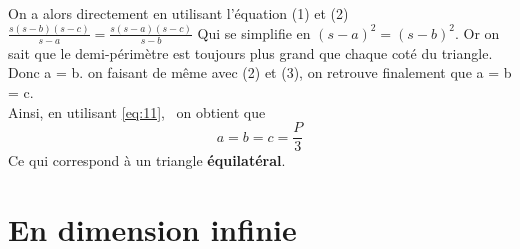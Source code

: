 \documentclass[12pt]{report}
\begin{document}
On a alors directement en utilisant l'équation (1) et (2) $\frac{s(s-b)(s-c)}{s-a} = \frac{s(s-a)(s-c)}{s-b}$
Qui se simplifie en $(s-a)^{2}=(s-b)^{2}$.
Or on sait que le demi-périmètre est toujours plus grand que chaque coté du triangle. Donc a = b.
on faisant de même avec (2) et (3), on retrouve finalement que a = b = c.\\
Ainsi, en utilisant \eqref{eq:11}, \ on obtient que 
\begin{equation}
   \boxed{a = b = c = \frac{P}{3}}
\end{equation}
Ce qui correspond à un triangle \textbf{équilatéral}.








\part{En dimension infinie}
\end{document}
